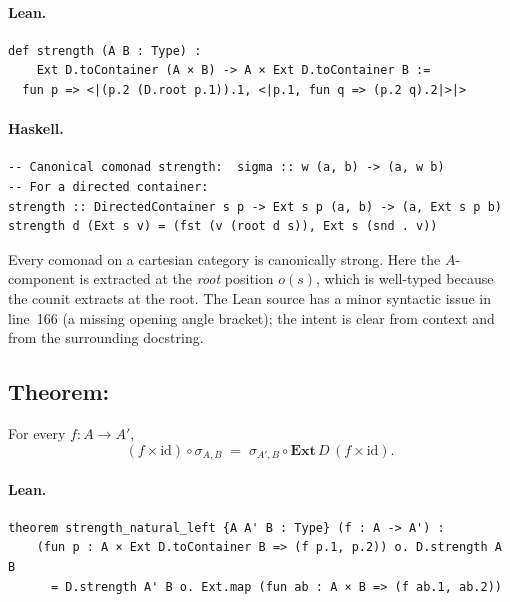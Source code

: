 \documentclass[11pt,a4paper]{article}
\begin{document}
\paragraph{Lean.}
\begin{lstlisting}[style=lean]
def strength (A B : Type) :
    Ext D.toContainer (A × B) -> A × Ext D.toContainer B :=
  fun p => <|(p.2 (D.root p.1)).1, <|p.1, fun q => (p.2 q).2|>|>
\end{lstlisting}

\paragraph{Haskell.}
\begin{lstlisting}[style=haskell]
-- Canonical comonad strength:  sigma :: w (a, b) -> (a, w b)
-- For a directed container:
strength :: DirectedContainer s p -> Ext s p (a, b) -> (a, Ext s p b)
strength d (Ext s v) = (fst (v (root d s)), Ext s (snd . v))
\end{lstlisting}

\begin{fidelitynote}
Every comonad on a cartesian category is canonically strong.  Here the
$A$-component is extracted at the \emph{root} position $o(s)$, which is
well-typed because the counit extracts at the root.  The Lean source has a
minor syntactic issue in line~166 (a missing opening angle bracket); the
intent is clear from context and from the surrounding docstring.
\end{fidelitynote}


\subsection{Theorem: }

\begin{thm}
For every $f : A \to A'$,
\[
  (f \times \mathrm{id}) \circ \sigma_{A,B}
  \;=\;
  \sigma_{A',B} \circ \mathbf{Ext}\,D\,(f \times \mathrm{id}).
\]
\end{thm}

\paragraph{Lean.}
\begin{lstlisting}[style=lean]
theorem strength_natural_left {A A' B : Type} (f : A -> A') :
    (fun p : A × Ext D.toContainer B => (f p.1, p.2)) o. D.strength A B
      = D.strength A' B o. Ext.map (fun ab : A × B => (f ab.1, ab.2))
\end{lstlisting}
\end{document}
